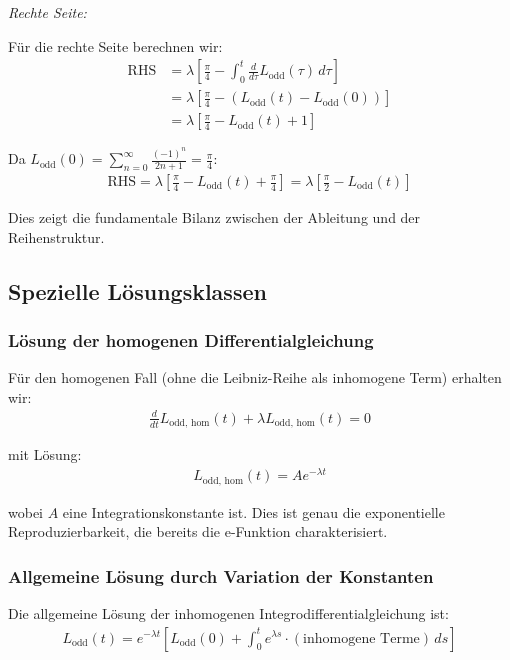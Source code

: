 \documentclass[a4paper, 12pt, twoside, openright]{report}
\theoremstyle{definition}
\theoremstyle{definition}
\begin{document}
\textit{Rechte Seite:}

Für die rechte Seite berechnen wir:
\begin{align}
	\text{RHS} &= \lambda \left[ \frac{\pi}{4} - \int_0^t \frac{d}{d\tau} L_{\text{odd}}(\tau) \, d\tau \right] \\
	&= \lambda \left[ \frac{\pi}{4} - (L_{\text{odd}}(t) - L_{\text{odd}}(0)) \right] \\
	&= \lambda \left[ \frac{\pi}{4} - L_{\text{odd}}(t) + 1 \right]
\end{align}

Da $L_{\text{odd}}(0) = \sum_{n=0}^{\infty} \frac{(-1)^n}{2n+1} = \frac{\pi}{4}$:
\begin{align}
	\text{RHS} = \lambda \left[ \frac{\pi}{4} - L_{\text{odd}}(t) + \frac{\pi}{4} \right] = \lambda \left[ \frac{\pi}{2} - L_{\text{odd}}(t) \right]
\end{align}

Dies zeigt die fundamentale Bilanz zwischen der Ableitung und der Reihenstruktur.

\subsection{Spezielle Lösungsklassen}

\subsubsection*{Lösung der homogenen Differentialgleichung}

Für den homogenen Fall (ohne die Leibniz-Reihe als inhomogene Term) erhalten wir:
\begin{align}
	\frac{d}{dt} L_{\text{odd, hom}}(t) + \lambda L_{\text{odd, hom}}(t) = 0
\end{align}

mit Lösung:
\begin{align}
	L_{\text{odd, hom}}(t) = A e^{-\lambda t}
\end{align}

wobei $A$ eine Integrationskonstante ist. Dies ist genau die exponentielle Reproduzierbarkeit, die bereits die e-Funktion charakterisiert.

\subsubsection*{Allgemeine Lösung durch Variation der Konstanten}

Die allgemeine Lösung der inhomogenen Integrodifferentialgleichung ist:
\begin{align}
	L_{\text{odd}}(t) = e^{-\lambda t} \left[ L_{\text{odd}}(0) + \int_0^t e^{\lambda s} \cdot (\text{inhomogene Terme}) \, ds \right]
\end{align}
\end{document}
